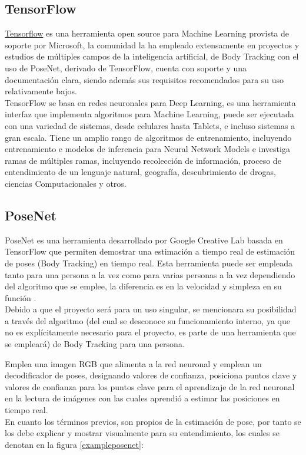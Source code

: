 \subsection{TensorFlow}

\href{https://www.tensorflow.org/lite/models/pose\_estimation/overview}{Tensorflow} es una herramienta open source para Machine Learning provista de soporte por Microsoft, la comunidad la ha empleado extensamente en proyectos y estudios de múltiples campos de la inteligencia artificial, de Body Tracking con el uso de PoseNet, derivado de TensorFlow, cuenta con soporte y una documentación clara, siendo además sus requisitos recomendados para su uso relativamente bajos. 
\\
TensorFlow se basa en redes neuronales para Deep Learning, es una herramienta interfaz que implementa algoritmos para Machine Learning, puede ser ejecutada con una variedad de sistemas, desde celulares hasta Tablets, e incluso sistemas a gran escala. Tiene un amplio rango de algoritmos de entrenamiento, incluyendo entrenamiento e modelos de inferencia para Neural Network Models e investiga ramas de múltiples ramas, incluyendo recolección de información, proceso de entendimiento de un lenguaje natural, geografía, descubrimiento de drogas, ciencias Computacionales y otros.  \cite{abadi2016tensorflow}

\subsection{PoseNet}

PoseNet es una herramienta desarrollado por Google Creative Lab basada en TensorFlow que permiten demostrar una estimación a tiempo real de estimación de poses (Body Tracking) en tiempo real. Esta herramienta puede ser empleada tanto para una persona a la vez como para varias personas a la vez dependiendo del algoritmo que se emplee, la diferencia es en la velocidad y simpleza en su función \cite{kendall2015posenet}.
\\
Debido a que el proyecto será para un uso singular, se mencionara su posibilidad a través del algoritmo (del cual se desconoce su funcionamiento interno, ya que no es explícitamente necesario para el proyecto, es parte de una herramienta que se empleará) de Body Tracking para una persona.

Emplea una imagen RGB que alimenta a la red neuronal y emplean un decodificador de poses, designando valores de confianza, posiciona puntos clave y valores de confianza para los puntos clave para el aprendizaje de la red neuronal en la lectura de imágenes con las cuales aprendió a estimar las posiciones en tiempo real\cite{oved2018real}.
\\
En cuanto los términos previos, son propios de la estimación de pose, por tanto se los debe explicar y mostrar visualmente para su entendimiento, los cuales se denotan en la figura \ref{exampleposenet}:

